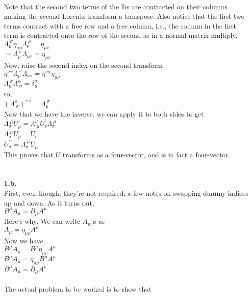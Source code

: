 \documentclass[prb,preprint]
{revtex4-1}
\newcommand{\PRLsep}{\noindent\makebox[\linewidth]{\resizebox{0.8888\linewidth}{2pt}{$\bullet$}}\bigskip}
\begin{document}
\\
Note that the second two terms of the lhs are contracted on their columns making the second Lorentz transform a transpose.  Also notice that the first two terms contract with a free row and a free column, i.e., the column in the first term is contracted onto the row of the second as in a normal matrix multiply.
\\
$\Lambda_\mu^{\;\sigma} \eta_{\sigma \rho} \Lambda_\nu^{\;\rho} = \eta_{\mu\nu}$
\\
$  = \Lambda_\mu^{\;\sigma} \Lambda_{\nu\sigma} = \eta_{\mu\nu}$
\\
Now, raise the second index on the second transform
\\
$\eta^{\nu\alpha} \Lambda_\mu^{\;\sigma} \Lambda_{\nu\sigma} = \eta^{\nu\alpha} \eta_{\mu\nu}$
\\
$\Lambda_\mu^{\;\sigma} \Lambda^\alpha_{\;\sigma} = \delta^\alpha_\mu$
\\
so,
\\
$\left(\Lambda^\alpha_{\;\sigma}\right)^{-1} = \Lambda_\mu^{\;\sigma}$
\\
Now that we have the inverse, we can apply it to both sides to get
\\
$\Lambda_\sigma^{\;\mu} U_\mu = \Lambda^\nu_{\;\mu} U^\prime_\nu \Lambda_\sigma^{\;\mu} $
\\
$\Lambda_\sigma^{\;\mu} U_\mu = U^\prime_\sigma$
\\
$U^\prime_\sigma = \Lambda_\sigma^{\;\mu} U_\mu$
\\
This proves that $U$ transforms as a four-vector, and is in fact a four-vector.
\\
\\
\PRLsep
\\
\textbf{1.b.}
\\
First, even though, they're not required, a few notes on swapping dummy indices up and down.  As it turns out,
\\
$B^\mu A_\mu = B_\mu A^\mu$
\\
Here's why.  We can write $A_mu$ as
\\
$A_\mu = \eta_{\mu\rho}A^\rho$
\\
Now we have
\\
$B^\mu A_\mu = B^\mu \eta_{\mu\rho} A^\rho$
\\
$B^\mu A_\mu = \eta_{\mu\rho} B^\mu A^\rho$
\\
$B^\mu A_\mu = B_\mu A^\rho$
\\
\\
The actual problem to be worked is to show that
\end{document}
